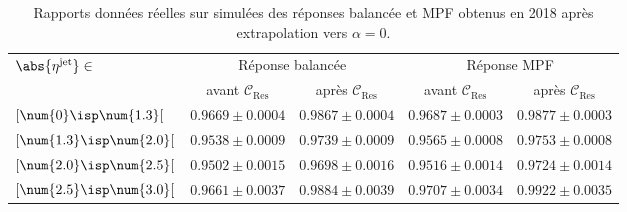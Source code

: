 \begin{table}[p]
\centering
\begin{tabular}{lcccc}
\toprule
\multirow{2}{*}{$\abs{\eta^\text{jet}}\in$} & \multicolumn{2}{c}{Réponse balancée} & \multicolumn{2}{c}{Réponse MPF} \\
\cmidrule(lr){2-3}\cmidrule(lr){4-5}
 & avant $\mathcal{C}_\text{Res}$ & après $\mathcal{C}_\text{Res}$ & avant $\mathcal{C}_\text{Res}$ & après $\mathcal{C}_\text{Res}$ \\
\midrule
$[\num{0}\isp \num{1.3}[$ & $\num{0.9669}\pm\num{0.0004}$ & $\num{0.9867}\pm\num{0.0004}$ & $\num{0.9687}\pm\num{0.0003}$ & $\num{0.9877}\pm\num{0.0003}$ \\
$[\num{1.3}\isp \num{2.0}[$ & $\num{0.9538}\pm\num{0.0009}$ & $\num{0.9739}\pm\num{0.0009}$ & $\num{0.9565}\pm\num{0.0008}$ & $\num{0.9753}\pm\num{0.0008}$ \\
$[\num{2.0}\isp \num{2.5}[$ & $\num{0.9502}\pm\num{0.0015}$ & $\num{0.9698}\pm\num{0.0016}$ & $\num{0.9516}\pm\num{0.0014}$ & $\num{0.9724}\pm\num{0.0014}$ \\
$[\num{2.5}\isp \num{3.0}[$ & $\num{0.9661}\pm\num{0.0037}$ & $\num{0.9884}\pm\num{0.0039}$ & $\num{0.9707}\pm\num{0.0034}$ & $\num{0.9922}\pm\num{0.0035}$ \\
\bottomrule
\end{tabular}
\caption[Rapports des réponses balancée et MPF obtenus en 2018 après extrapolation vers $\alpha=0$.]{Rapports données réelles sur simulées des réponses balancée et MPF obtenus en 2018 après extrapolation vers $\alpha=0$.}
\label{tab-responses_recap_table_L2L3Res_cross_check_2018ABCD}
\end{table}